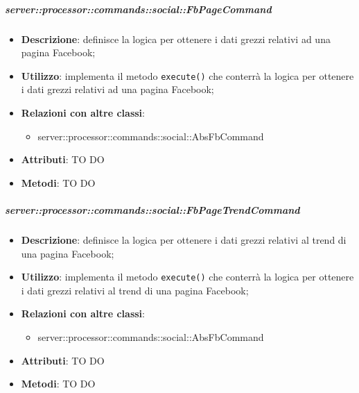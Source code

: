         \subparagraph{server::processor::commands::social::FbPageCommand} %
        \label{subp:bdsm_app_server_processor_commands_social_fbpagecommand}
        \begin{itemize}
          \item \textbf{Descrizione}: definisce la logica per ottenere i dati grezzi relativi ad una pagina Facebook;
          \item \textbf{Utilizzo}: implementa il metodo \texttt{execute()} che conterrà la logica per ottenere i dati grezzi relativi ad una pagina Facebook;
          \item \textbf{Relazioni con altre classi}:
            \begin{itemize}
              \item server::processor::commands::social::AbsFbCommand
            \end{itemize}
			\item \textbf{Attributi}: TO DO
			\item \textbf{Metodi}: TO DO
        \end{itemize}

        \subparagraph{server::processor::commands::social::FbPageTrendCommand} %
        \label{subp:bdsm_app_server_processor_commands_social_fbpagetrendcommand}
        \begin{itemize}
          \item \textbf{Descrizione}: definisce la logica per ottenere i dati grezzi relativi al trend di una pagina Facebook;
          \item \textbf{Utilizzo}: implementa il metodo \texttt{execute()} che conterrà la logica per ottenere i dati grezzi relativi al trend di una pagina Facebook;
          \item \textbf{Relazioni con altre classi}:
            \begin{itemize}
              \item server::processor::commands::social::AbsFbCommand
            \end{itemize}
			\item \textbf{Attributi}: TO DO
			\item \textbf{Metodi}: TO DO
        \end{itemize}


